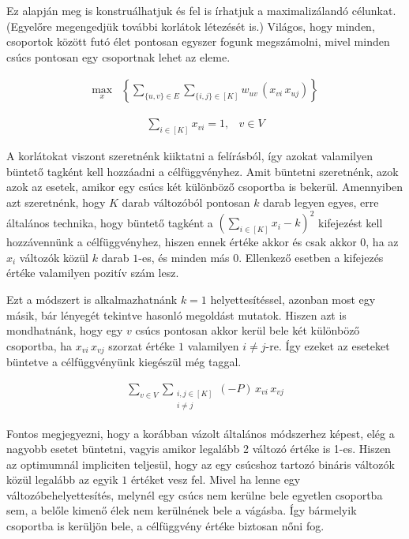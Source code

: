 Ez alapján meg is konstruálhatjuk és fel is írhatjuk a maximalizálandó célunkat. (Egyelőre megengedjük további korlátok létezését is.) Világos, hogy minden, csoportok között futó élet pontosan egyszer fogunk megszámolni, mivel minden csúcs pontosan egy csoportnak lehet az eleme.

\begin{align}
	 \max_{x} & \left\{ \sum _{\{{u,v}\} \in E}  \sum _{\{{i,j}\} \in [K]} w_{uv}\,(x_{vi} \, x_{uj}) \right\}
\end{align}

\begin{align}
	\sum _{i \in [K]} x_{vi} = 1, &v \in V
\end {align}

A korlátokat viszont szeretnénk kiiktatni a felírásból, így azokat valamilyen büntető tagként kell hozzáadni a célfüggvényhez. Amit büntetni szeretnénk, azok azok az esetek, amikor egy csúcs két különböző csoportba is bekerül. Amennyiben azt szeretnénk, hogy $K$ darab változóból pontosan $k$ darab legyen egyes, erre általános technika, hogy büntető tagként a $(\sum _{i \in [K]} x_i - k)^2 $ kifejezést kell hozzávennünk a célfüggvényhez, hiszen ennek értéke akkor és csak akkor $0$, ha az $x_i$ változók közül $k$ darab $1$-es, és minden más $0$. Ellenkező esetben a kifejezés értéke valamilyen pozitív szám lesz.

Ezt a módszert is alkalmazhatnánk $k=1$ helyettesítéssel, azonban most egy másik, bár lényegét tekintve hasonló megoldást mutatok. Hiszen azt is mondhatnánk, hogy egy $v$ csúcs pontosan akkor kerül bele két különböző csoportba, ha $x_{vi} \, x_{vj}$ szorzat értéke $1$ valamilyen $i \neq j$-re. Így ezeket az eseteket büntetve a célfüggvényünk kiegészül még  taggal. 

\begin{align}
	\sum _{v \in V } \sum _{\substack{ i,j \in [K] \\  i \neq j}} (-P) \, x_{vi} \, x_{vj} \label{QUBOOnehotonlyone}
\end{align}

Fontos megjegyezni, hogy a korábban vázolt általános módszerhez képest, elég a nagyobb esetet büntetni, vagyis amikor legalább 2 változó értéke is 1-es. Hiszen az optimumnál impliciten teljesül, hogy az egy csúcshoz tartozó bináris változók közül legalább az egyik $1$ értéket vesz fel. Mivel ha lenne egy változóbehelyettesítés, melynél egy csúcs nem kerülne bele egyetlen csoportba sem, a belőle kimenő élek nem kerülnének bele a vágásba. Így bármelyik csoportba is kerüljön bele, a célfüggvény értéke biztosan nőni fog.

